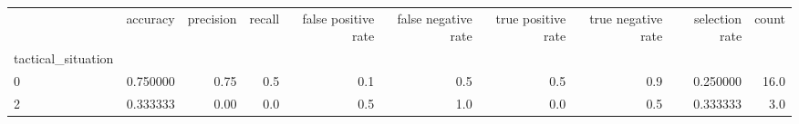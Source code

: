 \begin{tabular}{lrrrrrrrrr}
\toprule
{} &  accuracy &  precision &  recall &  false positive rate &  false negative rate &  true positive rate &  true negative rate &  selection rate &  count \\
tactical\_situation &           &            &         &                      &                      &                     &                     &                 &        \\
\midrule
0                  &  0.750000 &       0.75 &     0.5 &                  0.1 &                  0.5 &                 0.5 &                 0.9 &        0.250000 &   16.0 \\
2                  &  0.333333 &       0.00 &     0.0 &                  0.5 &                  1.0 &                 0.0 &                 0.5 &        0.333333 &    3.0 \\
\bottomrule
\end{tabular}
